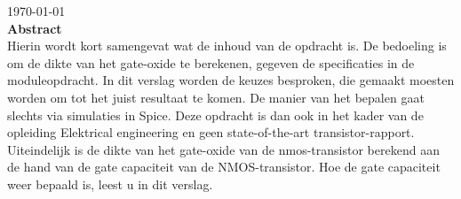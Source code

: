 \begin{titlepage}

{\large \today}\\[3cm] %


 
% 

\textbf{Abstract} \\
Hierin wordt kort samengevat wat de inhoud van de opdracht is. De bedoeling is om de dikte van het gate-oxide te berekenen, gegeven de specificaties 
in de moduleopdracht. In dit verslag worden de keuzes besproken, die gemaakt moesten worden om tot het juist resultaat te komen. De manier van het 
bepalen gaat slechts via simulaties in Spice. Deze opdracht is dan ook in het kader van de opleiding Elektrical engineering en geen state-of-the-art transistor-rapport.  Uiteindelijk is de dikte van het gate-oxide van de nmos-transistor berekend aan de hand van de gate capaciteit van de NMOS-transistor. Hoe de gate capaciteit weer bepaald is, leest u in dit verslag. 

\vfill %

\end{titlepage}
